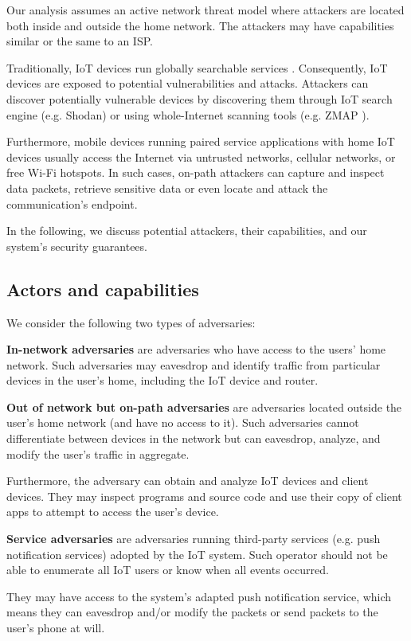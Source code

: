 Our analysis assumes an active network threat model where attackers are located both inside and outside the home network. The attackers may have capabilities similar or the same to an ISP.

Traditionally, IoT devices run globally searchable services \cite{antonakakis2017understanding}. Consequently, IoT devices are exposed to potential vulnerabilities and attacks. Attackers can discover potentially vulnerable devices by discovering them through IoT search engine (e.g. Shodan) or using whole-Internet scanning tools (e.g. ZMAP \cite{wiemer2001software}).

Furthermore, mobile devices running paired service applications with home IoT devices usually access the Internet via untrusted networks, cellular networks, or free Wi-Fi hotspots. In such cases, on-path attackers can capture and inspect data packets, retrieve sensitive data or even locate and attack the communication's endpoint. 

In the following, we discuss potential attackers, their capabilities, and our system's security guarantees.

\subsection{Actors and capabilities}
We consider the following two types of adversaries:

\textbf{In-network adversaries} are adversaries who have access to the users' home network. Such adversaries may eavesdrop and identify traffic from particular devices in the user's home, including the IoT device and router.


\textbf{Out of network but on-path adversaries} are adversaries located outside the user's home network (and have no access to it). Such adversaries cannot differentiate between devices in the network but can eavesdrop, analyze, and modify the user’s traffic in aggregate. 

Furthermore, the adversary can obtain and analyze IoT devices and client devices. They may inspect programs and source code and use their copy of client apps to attempt to access the user's device.

\textbf{Service adversaries} are adversaries running third-party services (e.g. push notification services) adopted by the IoT system. Such operator should not be able to enumerate all IoT users or know when all events occurred.

They may have access to the system's adapted push notification service, which means they can eavesdrop and/or modify the packets or send packets to the user's phone at will.
